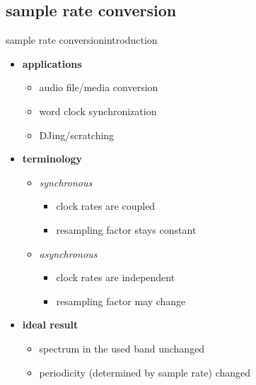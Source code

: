         \subsection{sample rate conversion}
	\begin{frame}{sample rate conversion}{introduction}
        \begin{itemize}
            \item   \textbf{applications}
                \begin{itemize}
                    \item   audio file/media conversion
                    \item   word clock synchronization
                    \item   DJing/scratching
                \end{itemize}
            \pause
            \bigskip
            \item   \textbf{terminology}
                \begin{itemize}
                    \item   \textit{synchronous}
                        \begin{itemize}
                            \item   clock rates are coupled
                            \item   resampling factor stays constant
                        \end{itemize}
                    \pause
                    \item   \textit{asynchronous}
                        \begin{itemize}
                            \item   clock rates are independent
                            \item   resampling factor may change
                        \end{itemize}
                \end{itemize}
            \bigskip
            \item   \textbf{ideal result}
                \begin{itemize}
                    \item   spectrum in the used band unchanged
                    \item   periodicity (determined by sample rate) changed
                \end{itemize}
        \end{itemize}
    \end{frame}
